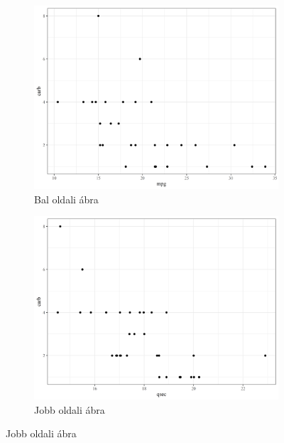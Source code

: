 \documentclass[]{elsarticle} %
\begin{document}
\begin{figure}[h]
\begin{multicols}{2}
\begin{figure}[H]
\includegraphics[width = \linewidth]{cookbook_files/figure-latex/carb-fig1-1}
\caption{Bal oldali ábra}
\label{fig:bar2_a6}
\end{figure}

\columnbreak

\begin{figure}[H]
\includegraphics[width = \linewidth]{cookbook_files/figure-latex/carb-fig1-2}
\centering
\caption{Jobb oldali ábra}
\label{fig:bar2_b6}
\end{figure}
\end{multicols}
\end{figure}
\end{document}
